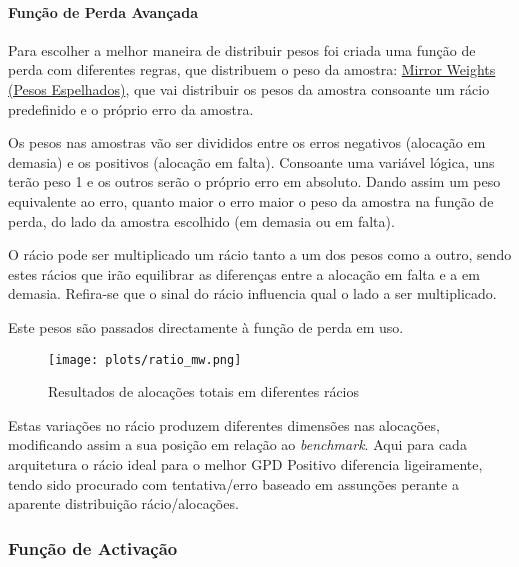 

\paragraph{Função de Perda Avançada}\label{se:advancedloss}
\text{ }  \par
Para escolher a melhor maneira de distribuir pesos foi criada uma função de perda com diferentes regras, que distribuem o peso da amostra:
\href{https://github.com/alquimodelia/alquitable/blob/main/alquitable/advanced_losses.py#L33}{Mirror Weights (Pesos Espelhados)},
que vai distribuir os pesos da amostra consoante um rácio predefinido e o próprio erro da amostra.\par
Os pesos nas amostras vão ser divididos entre os erros negativos (alocação em demasia) e os positivos (alocação em falta). Consoante uma variável lógica,  uns terão peso 1 e os outros serão o próprio erro em absoluto. Dando assim um peso equivalente ao erro, quanto maior o erro maior o peso da amostra na função de perda, do lado da amostra escolhido (em demasia ou em falta).\par
O rácio pode ser multiplicado um rácio tanto a um dos pesos como a outro, sendo estes rácios que irão equilibrar as diferenças entre a alocação em falta e a em demasia. Refira-se que o sinal do rácio influencia qual o lado a ser multiplicado.\par
Este pesos são passados directamente à função de perda em uso.\par


\begin{figure}[H]
    \centering
    \texttt{[image: plots/ratio\_mw.png]}
    \caption{Resultados de alocações totais em diferentes rácios}
    \label{fig:resexpratiomw}
  \end{figure}

Estas variações no rácio produzem diferentes dimensões nas alocações, modificando assim a sua posição em relação ao \textit{benchmark}. Aqui para cada arquitetura o rácio ideal para o melhor GPD Positivo diferencia ligeiramente, tendo sido procurado com tentativa/erro baseado em assunções perante a aparente distribuição rácio/alocações.\par


\subsubsection{Função de Activação}

